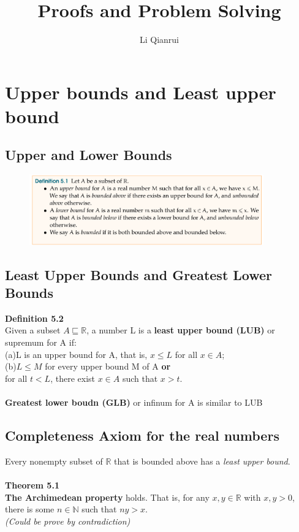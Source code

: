 \documentclass{article}
\title{Proofs and Problem Solving}
\author{Li Qianrui}
\begin{document}
\maketitle
\tableofcontents

\newpage


\section{Upper bounds and Least upper bound}

\subsection{Upper and Lower Bounds}

\begin{figure}[h]
    \centering
    \includegraphics[width=0.9\textwidth]{Definition5.1}\\
\end{figure}

\subsection{Least Upper Bounds and Greatest Lower Bounds}
\textbf{Definition 5.2} \\
Given a subset $A\sqsubseteq \mathbb{R}$, a number L is a \textbf{least upper bound (LUB)} or supremum for A if:\\
(a)L is an upper bound for A, that is, $x\leq L$ for all $x\in A$;\\
(b)$L\leq M$ for every upper bound M of A \textbf{or} \\ for all $t < L$, there exist $x\in A$ such that $x>t$.\\
 \\
\textbf{Greatest lower boudn (GLB)} or infinum for A is similar to LUB\\

\subsection{Completeness Axiom for the real numbers}
Every nonempty subset of $\mathbb{R}$ that is bounded above has a \emph{least upper bound}.\\
\\
\textbf{Theorem 5.1}\\
\textbf{The Archimedean property} holds. That is, for any $x,y\in \mathbb{R}$ with $x,y>0$, there is some $n\in \mathbb{N}$ such that $ny>x$.\\
\textit{(Could be prove by contradiction)}
\end{document}
